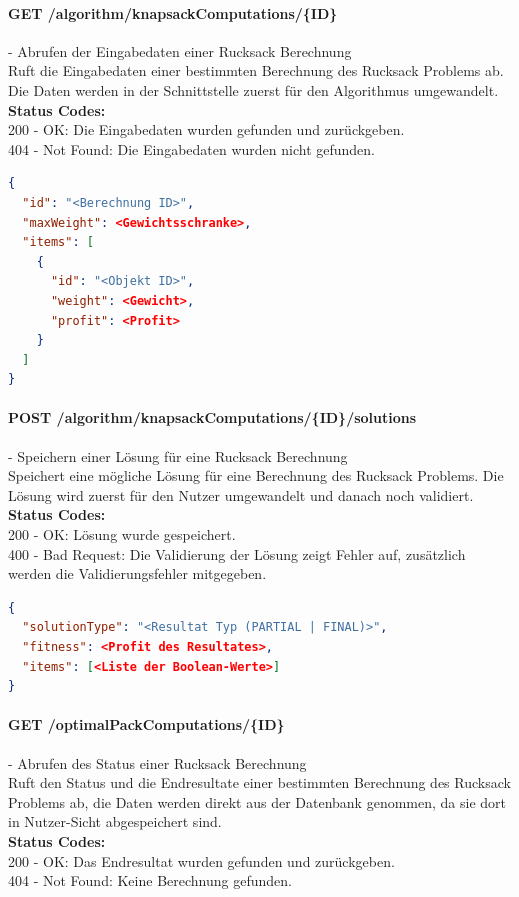 \paragraph{GET /algorithm/knapsackComputations/\{ID\}} - Abrufen der Eingabedaten einer Rucksack Berechnung\mbox{}\\
Ruft die Eingabedaten einer bestimmten Berechnung des Rucksack Problems ab. Die Daten werden in der Schnittstelle zuerst für den Algorithmus umgewandelt.\\
\textbf{Status Codes:}\\
200 - OK: Die Eingabedaten wurden gefunden und zurückgeben.\\
404 - Not Found: Die Eingabedaten wurden nicht gefunden.\\

\begin{lstlisting}[language=JSON, caption=Beispiel für Eingabedaten des Rucksack Problems für den Algorithmus, label=lst:input_knapsack_algo]  
{
  "id": "<Berechnung ID>",
  "maxWeight": <Gewichtsschranke>,
  "items": [
    {
      "id": "<Objekt ID>",
      "weight": <Gewicht>,
      "profit": <Profit>
    }
  ]
}
\end{lstlisting}

\paragraph{POST /algorithm/knapsackComputations/\{ID\}/solutions} - Speichern einer Lösung für eine Rucksack Berechnung\mbox{}\\
Speichert eine mögliche Lösung für eine Berechnung des Rucksack Problems. Die Lösung wird zuerst für den Nutzer umgewandelt und danach noch validiert.\\
\textbf{Status Codes:}\\
200 - OK: Lösung wurde gespeichert.\\
400 - Bad Request: Die Validierung der Lösung zeigt Fehler auf, zusätzlich werden die Validierungsfehler mitgegeben.\\

\begin{lstlisting}[language=JSON, caption=Beispiel eines Resultates für das Rucksack Problem aus Algorithmus-Sicht, label=lst:solution_knapsack_algo]  
{
  "solutionType": "<Resultat Typ (PARTIAL | FINAL)>",
  "fitness": <Profit des Resultates>,
  "items": [<Liste der Boolean-Werte>]
}
\end{lstlisting}

\paragraph{GET /optimalPackComputations/\{ID\}} - Abrufen des Status einer Rucksack Berechnung\mbox{}\\
Ruft den Status und die Endresultate einer bestimmten Berechnung des Rucksack Problems ab, die Daten werden direkt aus der Datenbank genommen, da sie dort in Nutzer-Sicht abgespeichert sind.\\
\textbf{Status Codes:}\\
200 - OK: Das Endresultat wurden gefunden und zurückgeben.\\
404 - Not Found: Keine Berechnung gefunden.\\

